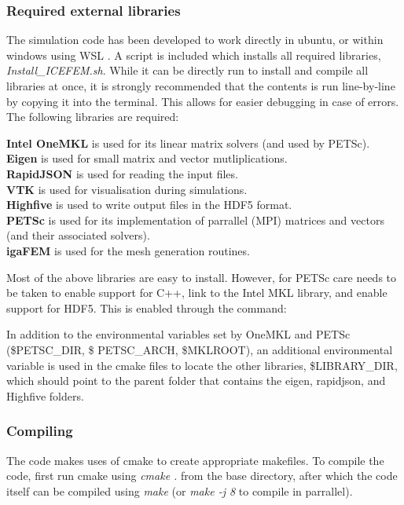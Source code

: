 \documentclass[3p]{elsarticle} %
\newcommand{\CodeSnipU}[4]{}
\begin{document}
\subsubsection{Required external libraries}
The simulation code has been developed to work directly in ubuntu, or within windows using WSL \citep{mattwojo}. A script is included which installs all required libraries, \textit{Install\_ICEFEM.sh}. While it can be directly run to install and compile all libraries at once, it is strongly recommended that the contents is run line-by-line by copying it into the terminal. This allows for easier debugging in case of errors. The following libraries are required:

\noindent \textbf{Intel OneMKL} \citep{oneMKL} is used for its linear matrix solvers (and used by PETSc).\\
\textbf{Eigen} \citep{eigen} is used for small matrix and vector mutliplications.\\
\textbf{RapidJSON} \citep{rapidjson} is used for reading the input files.\\
\textbf{VTK} \citep{VTK} is used for visualisation during simulations.\\
\textbf{Highfive} \citep{HighFive} is used to write output files in the HDF5 format.\\
\textbf{PETSc} \citep{PETSc} is used for its implementation of parrallel (MPI) matrices and vectors (and their associated solvers).\\
\textbf{igaFEM} \citep{igaFEM,igaFEM2} is used for the mesh generation routines.

Most of the above libraries are easy to install. However, for PETSc care needs to be taken to enable support for C++, link to the Intel MKL library, and enable support for HDF5. This is enabled through the command:
\CodeSnipU{Install_ICEFEM.sh}{78}{79}{Install\_ICEFEM.sh}

In addition to the environmental variables set by OneMKL and PETSc (\$PETSC\_DIR, \$ PETSC\_ARCH, \$MKLROOT), an additional environmental variable is used in the cmake files to locate the other libraries, \$LIBRARY\_DIR, which should point to the parent folder that contains the eigen, rapidjson, and Highfive folders. 

\subsubsection{Compiling}
The code makes uses of cmake to create appropriate makefiles. To compile the code, first run cmake using \textit{cmake .} from the base directory, after which the code itself can be compiled using \textit{make} (or \textit{make -j 8} to compile in parrallel). 
\end{document}
